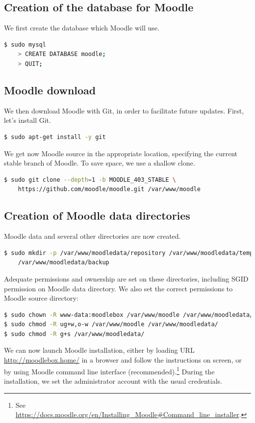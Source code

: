 \documentclass[12pt]{article}
\begin{document}
\subsection{Creation of the database for Moodle}

We first create the database which Moodle will use.
\begin{lstlisting}[language=bash]
$ sudo mysql
    > CREATE DATABASE moodle;
    > QUIT;
\end{lstlisting}

\subsection{Moodle download}

We then download Moodle with Git, in order to facilitate future updates.
First, let's install Git.
\begin{lstlisting}[language=bash]
$ sudo apt-get install -y git
\end{lstlisting}

We get now Moodle source in the appropriate location, specifying the current stable branch of Moodle.
To save space, we use a shallow clone.
\begin{lstlisting}[language=bash]
$ sudo git clone --depth=1 -b MOODLE_403_STABLE \
    https://github.com/moodle/moodle.git /var/www/moodle
\end{lstlisting}

\subsection{Creation of Moodle data directories}

Moodle data and several other directories are now created.
\begin{lstlisting}[language=bash]
$ sudo mkdir -p /var/www/moodledata/repository /var/www/moodledata/temp \
    /var/www/moodledata/backup
\end{lstlisting}
Adequate permissions and ownership are set on these directories, including SGID permission on Moodle data directory.
We also set the correct permissions to Moodle source directory:
\begin{lstlisting}[language=bash]
$ sudo chown -R www-data:moodlebox /var/www/moodle /var/www/moodledata/
$ sudo chmod -R ug+w,o-w /var/www/moodle /var/www/moodledata/
$ sudo chmod -R g+s /var/www/moodledata/
\end{lstlisting}

We can now launch Moodle installation, either by loading URL \url{http://moodlebox.home/} in a browser and follow the instructions on screen, or by using Moodle command line interface (recommended).\footnote{See \url{https://docs.moodle.org/en/Installing_Moodle\#Command_line_installer}.}
During the installation, we set the administrator account with the usual credentials.
\end{document}
